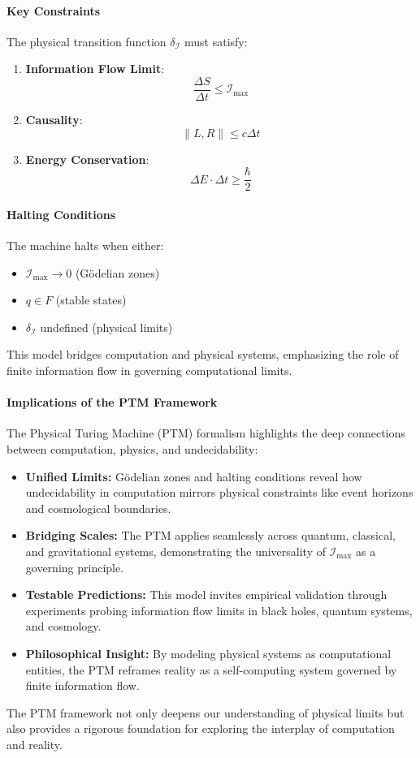 \documentclass[12pt]{article}
\begin{document}
\paragraph{Key Constraints}
The physical transition function \(\delta_{\mathcal{I}}\) must satisfy:
\begin{enumerate}
    \item \textbf{Information Flow Limit}:
    \[
    \frac{\Delta S}{\Delta t} \leq \mathcal{I}_{\text{max}}
    \]

    \item \textbf{Causality}:
    \[
    \|L,R\| \leq c\Delta t
    \]

    \item \textbf{Energy Conservation}:
    \[
    \Delta E \cdot \Delta t \geq \frac{\hbar}{2}
    \]
\end{enumerate}

\paragraph{Halting Conditions}
The machine halts when either:
\begin{itemize}
    \item \(\mathcal{I}_{\text{max}} \to 0\) (Gödelian zones)
    \item \(q \in F\) (stable states)
    \item \(\delta_{\mathcal{I}}\) undefined (physical limits)
\end{itemize}

This model bridges computation and physical systems, emphasizing the role of finite information flow in governing computational limits.


\paragraph{Implications of the PTM Framework}
The Physical Turing Machine (PTM) formalism highlights the deep connections between computation, physics, and undecidability:
\begin{itemize}
    \item \textbf{Unified Limits:} Gödelian zones and halting conditions reveal how undecidability in computation mirrors physical constraints like event horizons and cosmological boundaries.
    \item \textbf{Bridging Scales:} The PTM applies seamlessly across quantum, classical, and gravitational systems, demonstrating the universality of \(\mathcal{I}_{\text{max}}\) as a governing principle.
    \item \textbf{Testable Predictions:} This model invites empirical validation through experiments probing information flow limits in black holes, quantum systems, and cosmology.
    \item \textbf{Philosophical Insight:} By modeling physical systems as computational entities, the PTM reframes reality as a self-computing system governed by finite information flow.
\end{itemize}
The PTM framework not only deepens our understanding of physical limits but also provides a rigorous foundation for exploring the interplay of computation and reality.
\end{document}
